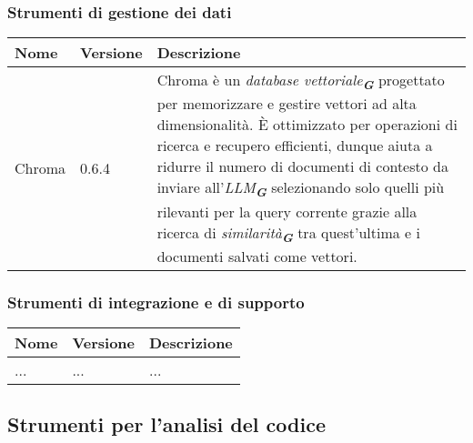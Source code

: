 \subsubsection{Strumenti di gestione dei dati}
\label{subsec:strumenti_gestione_dati}
\begin{table}[h!]
    \centering
    \renewcommand{\arraystretch}{1.6} %
    \begin{tabularx}{\textwidth}{|p{2cm}|p{2cm}|X|} \hline
    \rowcolor[HTML]{FFD700} 
    \textbf{Nome} & \textbf{Versione} & \textbf{Descrizione} \\ \hline
    Chroma & 0.6.4 & Chroma è un \emph{database vettoriale}\textsubscript{\textbf{\textit{G}}} progettato per memorizzare e
                    gestire vettori ad alta dimensionalità. 
                    È ottimizzato per operazioni di ricerca e recupero efficienti, dunque aiuta a ridurre il numero di documenti
                    di contesto da inviare all'\emph{LLM}\textsubscript{\textbf{\textit{G}}} selezionando solo quelli più rilevanti
                    per la query corrente grazie alla ricerca di \emph{similarità}\textsubscript{\textbf{\textit{G}}} tra 
                    quest'ultima e i documenti salvati come vettori. \\ \hline
    \end{tabularx}
\end{table}

\subsubsection{Strumenti di integrazione e di supporto}
\begin{table}[h!]
    \centering
    \renewcommand{\arraystretch}{1.6} %
    \begin{tabularx}{\textwidth}{|p{2cm}|p{2cm}|X|} \hline
    \rowcolor[HTML]{FFD700} 
    \textbf{Nome} & \textbf{Versione} & \textbf{Descrizione} \\ \hline
    ... & ... & ... \\ \hline
    \end{tabularx}
\end{table}

\newpage

\subsection{Strumenti per l’analisi del codice}

